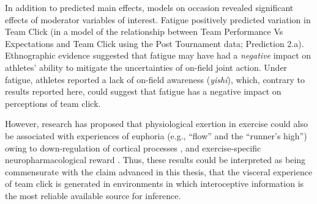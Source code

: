 \begin{CJK}{UTF8}{gbsn}

In addition to predicted main effects, models on occasion revealed significant effects of moderator variables of interest.  Fatigue positively predicted variation in Team Click (in a model of the relationship between Team Performance Vs Expectations and Team Click using the Post Tournament data; Prediction 2.a).  Ethnographic evidence suggested that fatigue may have had a \textit{negative} impact on athletes' ability to mitigate the uncertainties of on-field joint action.  Under fatigue, athletes reported a lack of on-field awareness (\textit{yishi}), which, contrary to results reported here, could suggest that fatigue has a negative impact on perceptions of team click.

However, research has proposed that physiological exertion in exercise could also be associated with experiences of euphoria (e.g., ``flow'' and the ``runner's high'') owing to down-regulation of cortical processes \citep{Dietrich2011}, and exercise-specific neuropharmacological reward \citep{Raichlen2013}.    Thus, these results could be interpreted as being commensurate with the claim advanced in this thesis, that the visceral experience of team click is generated in environments in which interoceptive information is the most reliable available source for inference.


\end{CJK}
